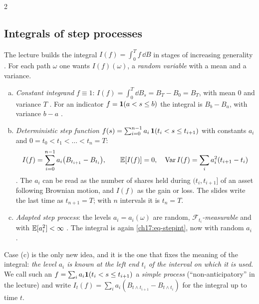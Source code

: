 \begin{paracol}{2}
\subsection{Integrals of step processes}\label{ch17:sec-stepint}
The lecture builds the integral $I(f)=\int_0^Tf\,\dd B$ in stages of increasing generality
. For each path $\omega$ one wants $I(f)(\omega)$, a \emph{random variable} with a mean and a
variance.
\begin{enumerate}[(a)]
  \item \emph{Constant integrand} $f\equiv1$: $I(f)=\int_0^T\dd B_s=B_T-B_0=B_T$, with mean $0$ and variance $T$
        . For an indicator $f=\mathbf{1}(a<s\le b)$ the integral is $B_b-B_a$, with variance $b-a$
        .
  \item \emph{Deterministic step function} $f(s)=\sum_{i=0}^{n-1}a_i\,\mathbf{1}(t_i<s\le t_{i+1})$ with constants $a_i$ and
        $0=t_0<t_1<\dots<t_n=T$:
        \begin{equation}\label{ch17:eq-stepint}
          I(f)=\sum_{i=0}^{n-1}a_i\bigl(B_{t_{i+1}}-B_{t_i}\bigr),\qquad
          \mathbb{E}[I(f)]=0,\quad \operatorname{Var} I(f)=\sum_ia_i^2(t_{i+1}-t_i)
        \end{equation}
        . The $a_i$ can be read as the number of shares held during $(t_i,t_{i+1}]$ of an asset
        following Brownian motion, and $I(f)$ as the gain or loss. The slides write the last time as $t_{n+1}=T$; with $n$ intervals it is $t_n=T$.
  \item \emph{Adapted step process}: the levels $a_i=a_i(\omega)$ are random, \emph{$\mathcal F_{t_i}$-measurable} and with $\mathbb{E}[a_i^2]<\infty$
        . The integral is again \eqref{ch17:eq-stepint}, now with random $a_i$
        .
\end{enumerate}
Case (c) is the only new idea, and it is the one that fixes the meaning of the integral: \emph{the level $a_i$ is known at the left
end $t_i$ of the interval on which it is used}. We call such an $f=\sum_ia_i\mathbf{1}(t_i<s\le t_{i+1})$ a \emph{simple process}
(``non-anticipatory'' in the lecture) and write $I_t(f)=\sum_ia_i(B_{t\wedge t_{i+1}}-B_{t\wedge t_i})$ for the integral up to time $t$.


\end{paracol}

